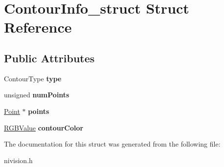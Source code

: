 \hypertarget{structContourInfo__struct}{
\section{ContourInfo\_\-struct Struct Reference}
\label{structContourInfo__struct}
}
\subsection*{Public Attributes}
\begin{DoxyCompactItemize}
\item 
\hypertarget{structContourInfo__struct_a4e5d54f3f19f4708e48a184bc7c02e88}{
ContourType {\bfseries type}}
\label{structContourInfo__struct_a4e5d54f3f19f4708e48a184bc7c02e88}

\item 
\hypertarget{structContourInfo__struct_a556d3678b4bb38d8ecf36902771fca13}{
unsigned {\bfseries numPoints}}
\label{structContourInfo__struct_a556d3678b4bb38d8ecf36902771fca13}

\item 
\hypertarget{structContourInfo__struct_a7742d639845853f6d002101c388b4b20}{
\hyperlink{structPoint__struct}{Point} $\ast$ {\bfseries points}}
\label{structContourInfo__struct_a7742d639845853f6d002101c388b4b20}

\item 
\hypertarget{structContourInfo__struct_a557f1cb60d84b5a3a860a3bc75f79d90}{
\hyperlink{structRGBValue__struct}{RGBValue} {\bfseries contourColor}}
\label{structContourInfo__struct_a557f1cb60d84b5a3a860a3bc75f79d90}

\end{DoxyCompactItemize}


The documentation for this struct was generated from the following file:\begin{DoxyCompactItemize}
\item 
nivision.h\end{DoxyCompactItemize}
